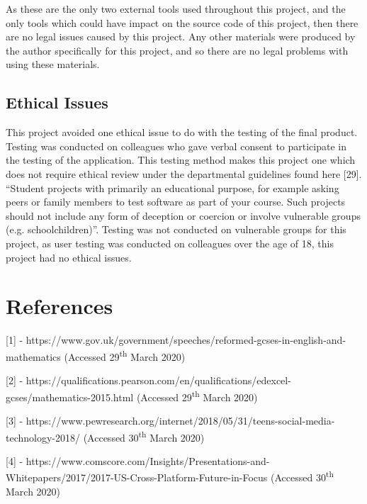 \documentclass{article}
\begin{document}
As these are the only two external tools used throughout this project, and the only tools which could have impact on the source code of this project, then there are no legal issues caused by this project. Any other materials were produced by the author specifically for this project, and so there are no legal problems with using these materials. \par

\subsection{Ethical Issues}

This project avoided one ethical issue to do with the testing of the final product. Testing was conducted on colleagues who gave verbal consent to participate in the testing of the application. This testing method makes this project one which does not require ethical review under the departmental guidelines found here [29]. ``Student projects with primarily an educational purpose, for example asking peers or family members to test software as part of your course. Such projects should not include any form of deception or coercion or involve vulnerable groups (e.g. schoolchildren)''. Testing was not conducted on vulnerable groups for this project, as user testing was conducted on colleagues over the age of 18, this project had no ethical issues. 

\section{References}
\label{section:references}

[1] - https://www.gov.uk/government/speeches/reformed-gcses-in-english-and-mathematics (Accessed 29\textsuperscript{th} March 2020) \par

[2] - https://qualifications.pearson.com/en/qualifications/edexcel-gcses/mathematics-2015.html (Accessed 29\textsuperscript{th} March 2020) \par

[3] - https://www.pewresearch.org/internet/2018/05/31/teens-social-media-technology-2018/ (Accessed 30\textsuperscript{th} March 2020) \par

[4] - https://www.comscore.com/Insights/Presentations-and-Whitepapers/2017/2017-US-Cross-Platform-Future-in-Focus (Accessed 30\textsuperscript{th} March 2020) \par
\end{document}

